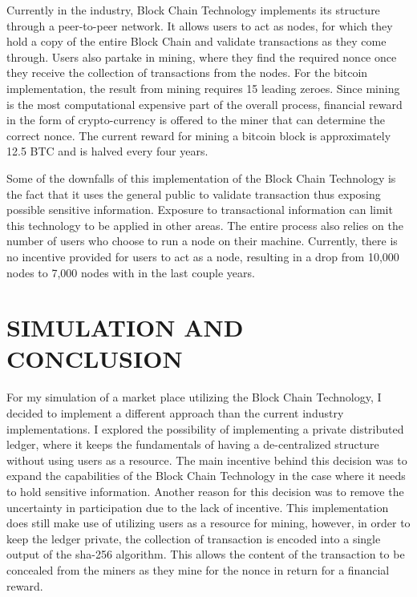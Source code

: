 \documentclass{article} %
\begin{document}
\begin{flushleft}
Currently in the industry, Block Chain Technology implements its structure through a peer-to-peer network. It allows users to act as nodes, for which they hold a copy of the entire Block Chain and validate transactions as they come through. Users also partake in mining, where they find the required nonce once they receive the collection of transactions from the nodes. For the bitcoin implementation, the result from mining requires 15 leading zeroes. Since mining is the most computational expensive part of the overall process, financial reward in the form of crypto-currency is offered to the miner that can determine the correct nonce. The current reward for mining a bitcoin block is approximately 12.5 BTC and is halved every four years.

Some of the downfalls of this implementation of the Block Chain Technology is the fact that it uses the general public to validate transaction thus exposing possible sensitive information. Exposure to transactional information can limit this technology to be applied in other areas. The entire process also relies on the number of users who choose to run a node on their machine. Currently, there is no incentive provided for users to act as a node, resulting in a drop from 10,000 nodes to 7,000 nodes with in the last couple years. 
\end{flushleft}

\noindent 
\section{SIMULATION AND CONCLUSION}

\begin{flushleft}
For my simulation of a market place utilizing the Block Chain Technology, I decided to implement a different approach than the current industry implementations. I explored the possibility of implementing a private distributed ledger, where it keeps the fundamentals of having a de-centralized structure without using users as a resource. The main incentive behind this decision was to expand the capabilities of the Block Chain Technology in the case where it needs to hold sensitive information. Another reason for this decision was to remove the uncertainty in participation due to the lack of incentive. This implementation does still make use of utilizing users as a resource for mining, however, in order to keep the ledger private, the collection of transaction is encoded into a single output of the sha-256 algorithm. This allows the content of the transaction to be concealed from the miners as they mine for the nonce in return for a financial reward.
\end{flushleft}
\end{document}
